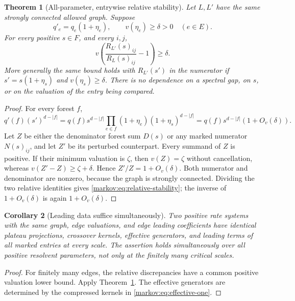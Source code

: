 \documentclass[11pt]{article}
\numberwithin{equation}{section}
\newtheorem{theorem}{Theorem}[section]
\newtheorem{corollary}[theorem]{Corollary}
\theoremstyle{definition}
\theoremstyle{remark}
\newcommand{\bigO}[1]{O_v(#1)}
\begin{document}
\begin{theorem}[All-parameter, entrywise relative stability]\label{markov:thm:stability}
Let $L,L'$ have the same strongly connected allowed graph. Suppose
\[
 q'_e=q_e(1+\eta_e),\qquad v(\eta_e)\ge\delta>0
 \quad(e\in E).
\]
For every positive $s\in F$, and every $i,j$,
\begin{equation}\label{markov:eq:relative-stability}
 v\!\left(\frac{R_{L'}(s)_{ij}}{R_L(s)_{ij}}-1\right)\ge\delta.
\end{equation}
More generally the same bound holds with $R_{L'}(s')$ in the numerator if
$s'=s(1+\eta_s)$ and $v(\eta_s)\ge\delta$. There is no dependence on a spectral
gap, on $s$, or on the valuation of the entry being compared.
\end{theorem}

\begin{proof}
For every forest $f$,
\[
 q'(f)(s')^{d-|f|}
 =q(f)s^{d-|f|}\prod_{e\in f}(1+\eta_e)(1+\eta_s)^{d-|f|}
 =q(f)s^{d-|f|}(1+\bigO{\delta}).
\]
Let $Z$ be either the denominator forest sum $D(s)$ or any marked numerator
$N(s)_{ij}$, and let $Z'$ be its perturbed counterpart. Every summand of $Z$ is
positive. If their minimum valuation is $\zeta$, then $v(Z)=\zeta$ without
cancellation, whereas $v(Z'-Z)\ge\zeta+\delta$. Hence
$Z'/Z=1+\bigO{\delta}$. Both numerator and denominator are nonzero, because the
graph is strongly connected. Dividing the two relative identities gives
\eqref{markov:eq:relative-stability}; the inverse of $1+\bigO{\delta}$ is again
$1+\bigO{\delta}$.
\end{proof}

\begin{corollary}[Leading data suffice simultaneously]\label{markov:cor:leading-equivalence}
Two positive rate systems with the same graph, edge valuations, and edge leading
coefficients have identical plateau projections, crossover kernels, effective
generators, and leading terms of all marked entries at every scale. The assertion
holds simultaneously over all positive resolvent parameters, not only at the
finitely many critical scales.
\end{corollary}

\begin{proof}
For finitely many edges, the relative discrepancies have a common positive
valuation lower bound. Apply Theorem~\ref{markov:thm:stability}. The effective generators
are determined by the compressed kernels in \eqref{markov:eq:effective-one}.
\end{proof}
\end{document}
